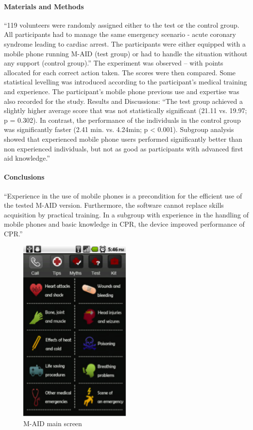 \documentclass[12pt, a4paper, twoside]{book}
\begin{document}
\paragraph{Materials and Methods} ``119 volunteers were randomly assigned either to the test or the control group. All participants had to manage the same emergency scenario - acute coronary syndrome leading to cardiac arrest. The participants were either equipped with a mobile phone running M-AID (test group) or had to handle the situation without any support (control group).''
The experiment was observed – with points allocated for each correct action taken. The scores were then compared. Some statistical levelling was introduced according to the participant’s medical training and experience. The participant’s mobile phone previous use and expertise was also recorded for the study. 
Results and Discussions: “The test group achieved a slightly higher average score that was not statistically significant (21.11 vs. 19.97; p = 0.302). In contrast, the performance of the individuals in the control group was significantly faster (2.41 min. vs. 4.24min; p < 0.001). Subgroup analysis showed that experienced mobile phone users performed significantly better than non experienced individuals, but not as good as participants with advanced first aid knowledge.”
\paragraph{Conclusions} ``Experience in the use of mobile phones is a precondition for the efficient use of the tested M-AID version. Furthermore, the software cannot replace skills acquisition by practical training. In a subgroup with experience in the handling of mobile phones and basic knowledge in CPR, the device improved performance of CPR.''

\begin{figure}[H]
\centering
\includegraphics[width=0.5\textwidth]{images/m-aid-1}
\caption{M-AID main screen}
\label{fig:m-aid-1}
\end{figure}
\end{document}
